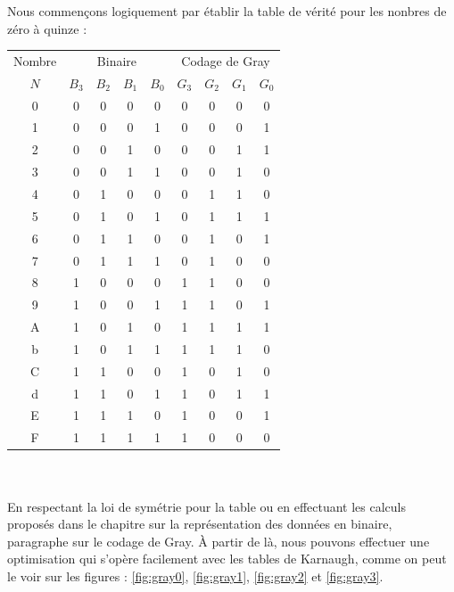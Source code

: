 \documentclass{book}
\theoremstyle{definition}
\theoremstyle{definition}
\begin{document}
Nous commençons logiquement par établir la table de vérité pour les nonbres de zéro à quinze :
\\

 \begin{tabular}{|c||c|c|c|c||c|c|c|c|}
    \hline
         Nombre &
         \multicolumn{4}{c||}{Binaire}& \multicolumn{4}{c|}{Codage de Gray}\\
        
         $N$ & $B_3$ & $B_2$ & $B_1$ & $B_0$ & $G_3$ & $G_2$ & $G_1$ & $G_0$ \\
    \hline 
        0 & 0 & 0 & 0 & 0 & 0 & 0 & 0 & 0 \\
        1 & 0 & 0 & 0 & 1 & 0 & 0 & 0 & 1 \\
        2 & 0 & 0 & 1 & 0 & 0 & 0 & 1 & 1 \\
        3 & 0 & 0 & 1 & 1 & 0 & 0 & 1 & 0 \\
    \hline
        4 & 0 & 1 & 0 & 0 & 0 & 1 & 1 & 0 \\
        5 & 0 & 1 & 0 & 1 & 0 & 1 & 1 & 1 \\
        6 & 0 & 1 & 1 & 0 & 0 & 1 & 0 & 1 \\
        7 & 0 & 1 & 1 & 1 & 0 & 1 & 0 & 0 \\
    \hline
        8 & 1 & 0 & 0 & 0 & 1 & 1 & 0 & 0 \\
        9 & 1 & 0 & 0 & 1 & 1 & 1 & 0 & 1 \\
        A & 1 & 0 & 1 & 0 & 1 & 1 & 1 & 1 \\
        b & 1 & 0 & 1 & 1 & 1 & 1 & 1 & 0 \\
    \hline
        C & 1 & 1 & 0 & 0 & 1 & 0 & 1 & 0 \\
        d & 1 & 1 & 0 & 1 & 1 & 0 & 1 & 1 \\
        E & 1 & 1 & 1 & 0 & 1 & 0 & 0 & 1 \\
        F & 1 & 1 & 1 & 1 & 1 & 0 & 0 & 0 \\
    \hline
  \end{tabular}
\\
\\

En respectant la loi de symétrie pour la table ou en effectuant les calculs proposés dans le chapitre sur la représentation des données en binaire, paragraphe sur le codage de Gray.
À partir de là, nous pouvons  effectuer une optimisation qui s'opère facilement avec les tables de Karnaugh, comme on peut le voir sur les figures : \ref{fig:gray0}, \ref{fig:gray1}, \ref{fig:gray2} et \ref{fig:gray3}. 
\end{document}
